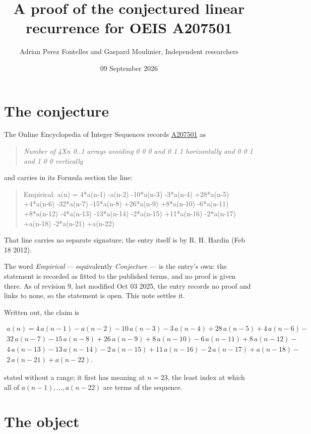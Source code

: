 \documentclass[11pt]{article}
\title{A proof of the conjectured linear recurrence for OEIS A207501}
\author{Adrian Perez Fontelles and Gaspard Moulinier, Independent researchers}
\date{09 September 2026}
\theoremstyle{definition}
\begin{document}
\maketitle
\section{The conjecture}

The Online Encyclopedia of Integer Sequences records \href{https://oeis.org/A207501}{A207501} as

\begin{quote}\itshape Number of 4Xn 0..1 arrays avoiding 0 0 0 and 0 1 1 horizontally and 0 0 1 and 1 0 0 vertically\end{quote}

and carries in its Formula section the line:

\begin{quote}\ttfamily Empirical: a(n) = 4*a(n-1) -a(n-2) -10*a(n-3) -3*a(n-4) +28*a(n-5) +4*a(n-6) -32*a(n-7) -15*a(n-8) +26*a(n-9) +8*a(n-10) -6*a(n-11) +8*a(n-12) -4*a(n-13) -13*a(n-14) -2*a(n-15) +11*a(n-16) -2*a(n-17) +a(n-18) -2*a(n-21) +a(n-22)\end{quote}

That line carries no separate signature; the entry itself is by R. H. Hardin (Feb 18 2012).

The word {\itshape Empirical} --- equivalently {\itshape Conjecture} --- is the entry's own: the statement is recorded as fitted to the published terms, and no proof is given there. As of revision 9, last modified Oct 03 2025, the entry records no proof and links to none, so the statement is open. This note settles it.

Written out, the claim is

\begin{multline*} a(n) = 4\,a(n-1) - a(n-2) - 10\,a(n-3) - 3\,a(n-4) + 28\,a(n-5) + 4\,a(n-6) - \\ 32\,a(n-7) - 15\,a(n-8) + 26\,a(n-9) + 8\,a(n-10) - 6\,a(n-11) + 8\,a(n-12) - \\ 4\,a(n-13) - 13\,a(n-14) - 2\,a(n-15) + 11\,a(n-16) - 2\,a(n-17) + a(n-18) - \\ 2\,a(n-21) + a(n-22). \end{multline*}

stated without a range; it first has meaning at $n = 23$, the least index at which all of $a(n-1),\dots,a(n-22)$ are terms of the sequence.

\section{The object}
\end{document}
